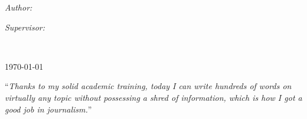 \documentclass[
12pt, %
onehalfspacing, %
headsepline, %
]{MastersDoctoralThesis} %
\begin{document}
\begin{titlepage}
\begin{center}
\begin{minipage}[t]{0.4\textwidth}
\begin{flushleft} \large
\emph{Author:}\\
\href{http://www.johnsmith.com}{\authorname} %
\end{flushleft}
\end{minipage}
\begin{minipage}[t]{0.4\textwidth}
\begin{flushright} \large
\emph{Supervisor:} \\
\href{http://www.jamessmith.com}{\supname} %
\end{flushright}
\end{minipage}\\[3cm]
 
\vfill

 
\vfill

{\large \today}\\[4cm] %
 
\vfill
\end{center}
\end{titlepage}





\vspace*{0.2\textheight}

\noindent\enquote{\itshape Thanks to my solid academic training, today I can write hundreds of words on virtually any topic without possessing a shred of information, which is how I got a good job in journalism.}\bigbreak
\end{document}
